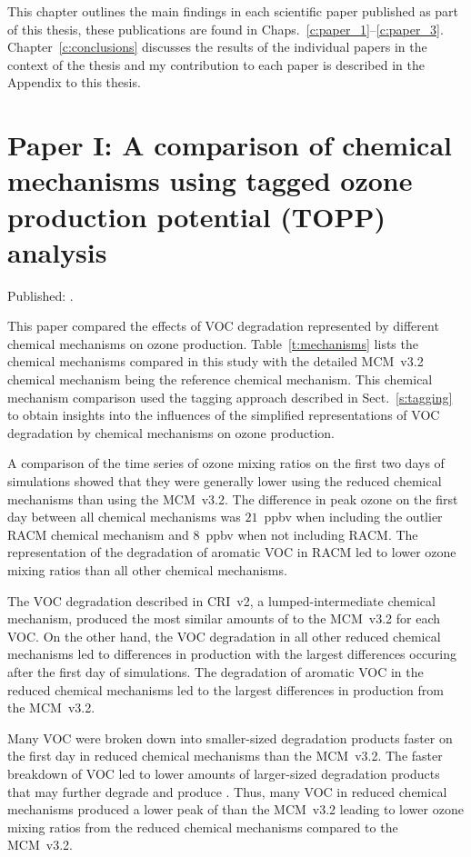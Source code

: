This chapter outlines the main findings in each scientific paper published as part of this thesis, these publications are found in Chaps.~\ref{c:paper_1}--\ref{c:paper_3}.
Chapter~\ref{c:conclusions} discusses the results of the individual papers in the context of the thesis and my contribution to each paper is described in the Appendix to this thesis.

\singlespacing
\section{Paper I: A comparison of chemical mechanisms using tagged ozone production potential (TOPP) analysis} \label{s:chemical_mechanism_results} 
\onehalfspacing

\noindent
Published: .

This paper compared the effects of VOC degradation represented by different chemical mechanisms on ozone production.
Table~\ref{t:mechanisms} lists the chemical mechanisms compared in this study with the detailed MCM~v3.2 chemical mechanism being the reference chemical mechanism.
This chemical mechanism comparison used the tagging approach described in Sect.~\ref{s:tagging} to obtain insights into the influences of the simplified representations of VOC degradation by chemical mechanisms on ozone production.

A comparison of the time series of ozone mixing ratios on the first two days of simulations showed that they were generally lower using the reduced chemical mechanisms than using the MCM~v3.2.
The difference in peak ozone on the first day between all chemical mechanisms was $21$~ppbv when including the outlier RACM chemical mechanism and $8$~ppbv when not including RACM.
The representation of the degradation of aromatic VOC in RACM led to lower ozone mixing ratios than all other chemical mechanisms.

The VOC degradation described in CRI~v2, a lumped-intermediate chemical mechanism, produced the most similar amounts of  to the MCM~v3.2 for each VOC.
On the other hand, the VOC degradation in all other reduced chemical mechanisms led to differences in  production with the largest differences occuring after the first day of simulations.
The degradation of aromatic VOC in the reduced chemical mechanisms led to the largest differences in  production from the MCM~v3.2.

Many VOC were broken down into smaller-sized degradation products faster on the first day in reduced chemical mechanisms than the MCM~v3.2.
The faster breakdown of VOC led to lower amounts of larger-sized degradation products that may further degrade and produce .
Thus, many VOC in reduced chemical mechanisms produced a lower peak of  than the MCM~v3.2 leading to lower ozone mixing ratios from the reduced chemical mechanisms compared to the MCM~v3.2.

